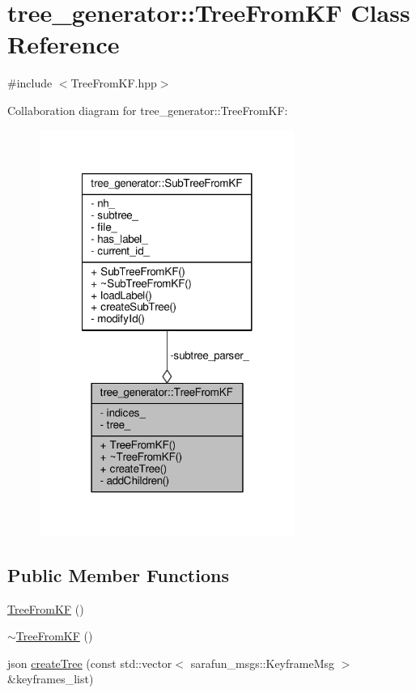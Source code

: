 \hypertarget{classtree__generator_1_1TreeFromKF}{\section{tree\-\_\-generator\-:\-:Tree\-From\-K\-F Class Reference}
\label{classtree__generator_1_1TreeFromKF}
}


{\ttfamily \#include $<$Tree\-From\-K\-F.\-hpp$>$}



Collaboration diagram for tree\-\_\-generator\-:\-:Tree\-From\-K\-F\-:
\nopagebreak
\begin{figure}[H]
\begin{center}
\leavevmode
\includegraphics[width=236pt]{d1/dce/classtree__generator_1_1TreeFromKF__coll__graph}
\end{center}
\end{figure}
\subsection*{Public Member Functions}
\begin{DoxyCompactItemize}
\item 
\hyperlink{classtree__generator_1_1TreeFromKF_ae29828b16945e36e961283811c25e082_ae29828b16945e36e961283811c25e082}{Tree\-From\-K\-F} ()
\item 
\hyperlink{classtree__generator_1_1TreeFromKF_aaf65aa5f86c50c7496494e9338a10931_aaf65aa5f86c50c7496494e9338a10931}{$\sim$\-Tree\-From\-K\-F} ()
\item 
json \hyperlink{classtree__generator_1_1TreeFromKF_ac056f11be0625689ab20954944443755_ac056f11be0625689ab20954944443755}{create\-Tree} (const std\-::vector$<$ sarafun\-\_\-msgs\-::\-Keyframe\-Msg $>$ \&keyframes\-\_\-list)
\end{DoxyCompactItemize}

